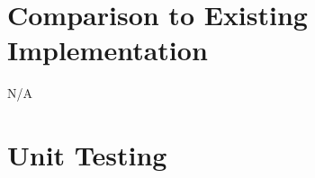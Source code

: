 \documentclass[12pt, titlepage]{article}
\begin{document}

	
\section{Comparison to Existing Implementation}	

N/A

\section{Unit Testing}
\end{document}

